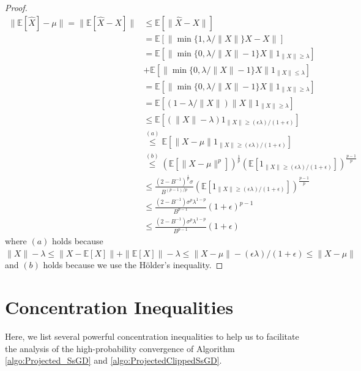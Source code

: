 \documentclass{article}
\def \E {\mathbb{E}}
\newcommand{\norm}[2][]{\left\|#2\right\|^{#1}}
\begin{document}
\begin{proof}
\begin{align}
    \|\E[\hat{X}]-\mu\| = \|\E[\hat{X}-X]\|&\leq \E[\|\hat{X}-X\|]\nonumber\\
    &= \E[\norm{\min\{1,\lambda/\|X\|\}X-X}]\nonumber\\
    &= \E[\|\min\{0,\lambda/\|X\|-1\}X\|1_{\|X\|\geq\lambda}]\nonumber\\
    &+ \E[\|\min\{0,\lambda/\|X\|-1\}X\|1_{\|X\|\leq\lambda}]\nonumber\\
    &= \E[\|\min\{0,\lambda/\|X\|-1\}X\|1_{\|X\|\geq\lambda}]\nonumber\\
    &= \E[(1-\lambda/\|X\|)\|X\|1_{\|X\|\geq\lambda}]\nonumber\\
    &\leq \E[(\|X\|-\lambda)1_{\|X\|\geq(\epsilon\lambda)/(1+\epsilon)}]\nonumber\\
    &\overset{(a)}{\leq} \E[\|X-\mu\|1_{\|X\|\geq(\epsilon\lambda)/(1+\epsilon)}]\nonumber\\
    &\overset{(b)}{\leq} (\E[\|X-\mu\|^p])^{\frac{1}{p}}(\E[1_{\|X\|\geq(\epsilon\lambda)/(1+\epsilon)}])^{\frac{p-1}{p}}\nonumber\\
    &\leq \frac{(2-B^{-1})^{\frac{1}{p}}\sigma}{B^{(p-1)/p}}(\E[1_{\|X\|\geq(\epsilon\lambda)/(1+\epsilon)}])^{\frac{p-1}{p}}\nonumber\\
    &\leq \frac{(2-B^{-1})\sigma^p\lambda^{1-p}}{B^{p-1}}(1+\epsilon)^{p-1}\nonumber\\
    &\leq \frac{(2-B^{-1})\sigma^p\lambda^{1-p}}{B^{p-1}}(1+\epsilon)
\end{align}
where $(a)$ holds because $\|X\|-\lambda\leq\|X-\E[X]\|+\|\E[X]\|-\lambda \leq \|X-\mu\| - (\epsilon\lambda)/(1+\epsilon)\leq \|X-\mu\| $ and $(b)$ holds because we use the Hölder's inequality.

\end{proof}

\section{Concentration Inequalities}
Here, we list several powerful concentration inequalities to help us to facilitate the analysis of the high-probability convergence of Algorithm \ref{algo:Projected_SsGD} and \ref{algo:ProjectedClippedSsGD}.
\end{document}
